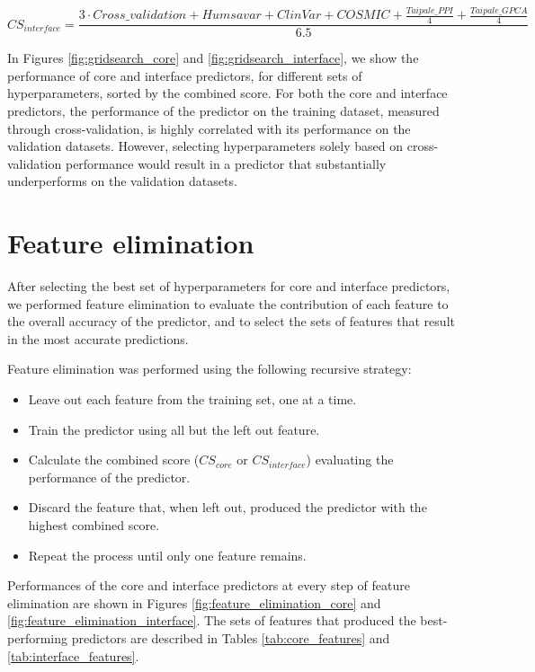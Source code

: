 \begin{equation} \label{eq:combined_score_interface}
    CS_{interface} = \frac{3 \cdot Cross\_validation + Humsavar + ClinVar + COSMIC + \frac{Taipale\_{PPI}}{4} + \frac{Taipale\_{GPCA}}{4}}{6.5}
\end{equation}

In Figures \ref{fig:gridsearch_core} and \ref{fig:gridsearch_interface}, we show the performance of core and interface predictors, for different sets of hyperparameters, sorted by the combined score. For both the core and interface predictors, the performance of the predictor on the training dataset, measured through cross-validation, is highly correlated with its performance on the validation datasets. However, selecting hyperparameters solely based on cross-validation performance would result in a predictor that substantially underperforms on the validation datasets.

\clearpage



\clearpage
\section{Feature elimination} \label{sec:feature_elimination}

After selecting the best set of hyperparameters for core and interface predictors, we performed feature elimination to evaluate the contribution of each feature to the overall accuracy of the predictor, and to select the sets of features that result in the most accurate predictions.

Feature elimination was performed using the following recursive strategy:

\vspace{-\topsep}
\begin{itemize}
	\itemsep0em
	\item Leave out each feature from the training set, one at a time.
	\item Train the predictor using all but the left out feature.
	\item Calculate the combined score ($CS_{core}$ or $CS_{interface}$) evaluating the performance of the predictor.
	\item Discard the feature that, when left out, produced the predictor with the highest combined score.
	\item Repeat the process until only one feature remains.
\end{itemize}

Performances of the core and interface predictors at every step of feature elimination are shown in Figures \ref{fig:feature_elimination_core} and \ref{fig:feature_elimination_interface}. The sets of features that produced the best-performing predictors are described in Tables \ref{tab:core_features} and \ref{tab:interface_features}.


